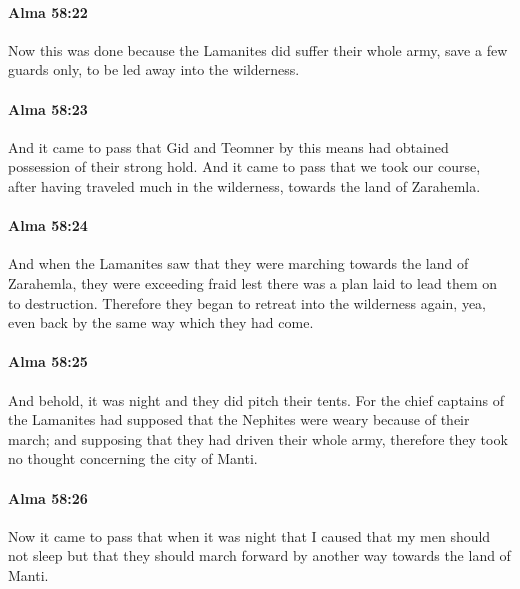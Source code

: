 		\paragraph{Alma 58:22} %
			\label{ALMA-58-22}

			Now this was done because the Lamanites did suffer
			their whole army, save a few guards only,
			to be led away into the wilderness.

		\paragraph{Alma 58:23} %
			\label{ALMA-58-23}

			And it came to pass that
			Gid and Teomner by this means had obtained possession of their strong hold.
			And it came to pass that we took our course,
			after having traveled much in the wilderness,
			towards the land of Zarahemla.

		\paragraph{Alma 58:24} %
			\label{ALMA-58-24}

			And when the Lamanites saw that they were marching
			towards the land of Zarahemla,
			they were exceeding fraid
			lest there was a plan laid to lead them on to destruction.
			Therefore they began to retreat into the wilderness again,
			yea, even back by the same way which they had come.

		\paragraph{Alma 58:25} %
			\label{ALMA-58-25}

			And behold, it was night and they did pitch their tents.
			For the chief captains of the Lamanites had supposed
			that the Nephites were weary because of their march;
			and supposing that they had driven their whole army,
			therefore they took no thought concerning the city of Manti.

		\paragraph{Alma 58:26} %
			\label{ALMA-58-26}

			Now it came to pass that when it was night
			that I caused that my men should not sleep
			but that they should march forward by another way towards the land of Manti.

